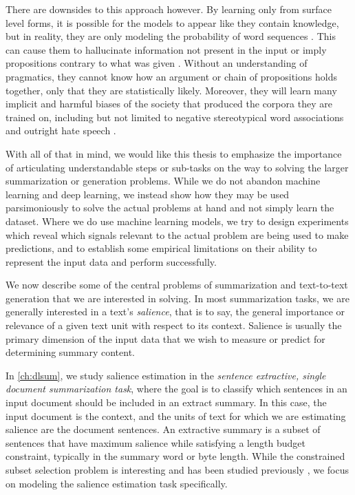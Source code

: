 There are downsides to this approach however. By learning only from surface
level forms, it is possible for the models to appear like they contain
knowledge, but in reality, they are only modeling the probability of word
sequences \citep{bender2020}. This can cause them to hallucinate information
not present in the input or imply propositions contrary to what was given
\citep{wiseman2017,kryscinski2019,maynez2020,kryscinski2020}.  Without an
understanding of pragmatics, they cannot know how an argument or chain of
propositions holds together, only that they are statistically likely.
Moreover, they will learn many implicit and harmful biases of the society that
produced the corpora they are trained on, including but not limited to
negative stereotypical word associations \citep{bolukbasi2016,nissim2020} and
outright hate speech \citep{lee2016}.

With all of that in mind, we would like this thesis to emphasize the 
importance of articulating understandable steps or sub-tasks on the way to 
solving the larger summarization or generation problems.
While we do not abandon machine learning
and deep learning, we instead show how they may be used parsimoniously to
solve the actual problems at hand and not simply learn the dataset. Where we
do use machine learning models, we try to design experiments which reveal
which signals relevant to the actual problem are being used to make
predictions, and to establish some empirical limitations on their ability to
represent the input data and perform successfully. 
 
We now describe some of the central problems of
summarization and text-to-text generation that we are interested in solving.
In most summarization tasks, we are generally interested in a text's
\textit{salience}, that is to say, the general importance or relevance of a
given text unit with respect to its context. Salience is usually the primary
dimension of the input data that we wish to measure or predict for determining
summary content.  

In \autoref{ch:dlsum}, we study salience estimation in the \emph{sentence
extractive, single document summarization task}, where the goal is to classify
which sentences in an input document should be included in an extract summary.
In this case, the input document is the context, and the units of text for
which we are estimating salience are the document sentences.  An extractive
summary is a subset of sentences that have maximum salience while satisfying a
length budget constraint, typically in the summary word or byte length. While
the constrained subset selection problem is interesting and has been studied
previously \citep{goldstein1998,mcdonald2007,lin2010}, we focus on modeling
the salience estimation task specifically. 
 
